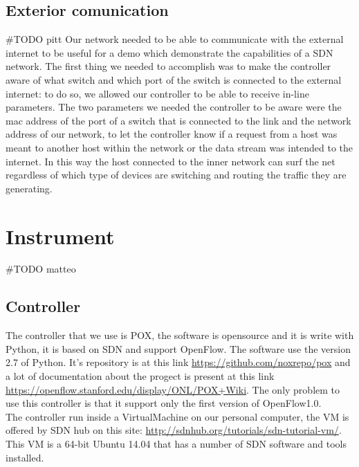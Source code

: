 \documentclass[conference,10pt]{IEEEtran}
\begin{document}
  \subsection{Exterior comunication}
  \#TODO pitt
	Our network needed to be able to communicate with the external internet to be useful for a demo which demonstrate the capabilities of a SDN network.
	The first thing we needed to accomplish was to make the controller aware of what switch and which port of the switch is connected to the external internet:
	to do so, we allowed our controller to be able to receive in-line parameters. The two parameters we needed the controller to be aware were the mac address of the
	port of a switch that is connected to the link and the network address of our network, to let the controller know if a request from a host was meant to another host
	within the network or the data stream was intended to the internet.
	In this way the host connected to the inner network can surf the net regardless of which type of devices are switching and routing the traffic they are generating.


\section{Instrument}\label{sec:instrument}
\#TODO matteo
  \subsection{Controller}
  The controller that we use is POX, the software is opensource and it is write with Python, it is based on SDN and support OpenFlow.
  The software use the version 2.7 of Python.
  It's repository is at this link \url{https://github.com/noxrepo/pox} and a lot of documentation about the progect
  is present at this link \url{https://openflow.stanford.edu/display/ONL/POX+Wiki}.
  The only problem to use this controller is that it support only the first version of OpenFlow1.0.
  \\
  The controller run inside a VirtualMachine on our personal computer,
  the VM is offered by SDN hub on this site: \url{http://sdnhub.org/tutorials/sdn-tutorial-vm/}.
  This VM is a 64-bit Ubuntu 14.04 that has a number of SDN software and tools installed.
\end{document}
